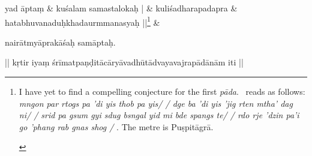 \documentclass[naipra.tex]{subfiles}
\begin{document}
\begin{sanskrit}
% 
%   


\medskip\versequote
{} yad āptaṃ &
\hspace{20pt} kuśalam  samastalokaḥ | \&
\versequote
kuliśadharapadapra &
\hspace{20pt} hatabhuvanaduḥkhadaurmmanasyaḥ ||\footnote{\begin{english}
	I have yet to find a compelling conjecture for the first \emph{pāda}.
	\TIB\ reads as follows: \emph{%
		mngon par rtogs pa 'di yis thob pa yis/ /
		dge ba 'di yis 'jig rten mtha' dag ni/ /
		srid pa gsum gyi sdug bsngal yid mi bde spangs te/ / 
		rdo rje 'dzin pa'i go 'phang rab gnas shog /
	}. The metre is Puṣpitāgrā.
\end{english}} \&




\medskip\pstart
nairātmyāprakāśaḥ samāptaḥ. 
\pend

\bigskip\pstart
\begin{center}
|| kṛtir iyaṃ śrīmatpaṇḍitācāryāvadhūtādvayavajrapādānām iti ||
\end{center}
\pend



\end{sanskrit}
\endnumbering
\end{document}
